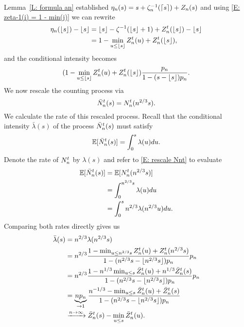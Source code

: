 Lemma~\ref{L: formula an} established $\eta_n(s) = s + \zeta^{-1}_n(\lceil s\rceil) + Z_n(s)$ 
and using \eqref{E: zeta-1(i) = 1 - min(j)} we can rewrite
\begin{equation*}
\begin{aligned}
\eta_n(\lfloor s\rfloor) - \lfloor s\rfloor 
&= \lfloor s\rfloor - \zeta^{-1}(\lfloor s\rfloor+1) + Z_n^t(\lfloor s\rfloor) - \lfloor s\rfloor \\
&= 1 - \min_{u \leq \lfloor s\rfloor} Z_n^t(u) + Z_n^t(\lfloor s\rfloor),
\end{aligned}
\end{equation*}
and the conditional intensity becomes
\begin{equation} \label{E: rate Nnt 2}
(1 - \min_{u \leq \lfloor s\rfloor} Z_n^t(u) + Z_n^t(\lfloor s\rfloor) \frac{p_n}{1-(s-\lfloor s\rfloor)p_n}.
\end{equation}
We now rescale the counting process via
\begin{equation} \label{E: rescale Nnt}
\bar{N}_n^t(s) = N_n^t(n^{2 / 3}s).
\end{equation}
We calculate the rate of this rescaled process.
Recall that the conditional intensity $\bar{\lambda}(s)$ of the process $\bar{N}_n^t(s)$ must satisfy
\begin{equation}
\mathbb{E}[\bar{N}_n^t(s)] = \int_{0}^{s} \lambda(u) du.
\end{equation}
Denote the rate of $N_n^t$ by $\lambda(s)$ and refer to \eqref{E: rescale Nnt} to evaluate
\begin{equation*}
\begin{aligned}
\mathbb{E}[\bar{N}_n^t(s)]
&= \mathbb{E}[N_n^t(n^{2 / 3}s)] \\
&= \int_{0}^{n^{2 / 3}s} \lambda(u) du \\
&= \int_{0}^{s} n^{2 / 3} \lambda(n^{2 / 3}u) du.
\end{aligned}
\end{equation*}
Comparing both rates directly gives us
\begin{equation*}
\begin{aligned}
\bar{\lambda}(s)
&= n^{2 / 3} \lambda(n^{2 / 3}s) \\
&= n^{2 / 3} \frac{1 - \min_{u \leq n^{2 / 3}s} Z_n^t(u) + Z_n^t(n^{2 / 3}s)}{1 - (n^{2 / 3}s - \lfloor n^{2 / 3}s\rfloor)p_n} p_n \\
&= n^{2 / 3} \frac{1 - n^{1 / 3} \min_{u \leq s} \bar{Z}^t_n(u) + n^{1 / 3}\bar{Z}^t_n(s)}{1 - (n^{2 / 3}s - \lfloor n^{2 / 3}s\rfloor)p_n} p_n \\
&= \underbrace{n p_n}_{\rightarrow 1} \frac{n^{-1 / 3} - \min_{u \leq s} \bar{Z}^t_n(u) + \bar{Z}^t_n(s)}{1 - (n^{2 / 3}s - \lfloor n^{2 / 3}s\rfloor)p_n} \\
&\xrightarrow{n \rightarrow \infty} \bar{Z}^t_n(s) - \min_{u \leq s}\bar{Z}^t_n(u).
\end{aligned}
\end{equation*}

